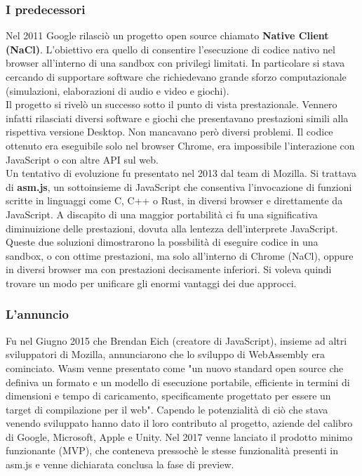 \subsubsection{I predecessori}
Nel 2011 Google rilasciò un progetto open source chiamato \textbf{Native Client (NaCl)}.
L'obiettivo era quello di consentire l'esecuzione di codice nativo nel browser all'interno di una sandbox con privilegi limitati.
In particolare si stava cercando di supportare software che richiedevano grande sforzo computazionale (simulazioni, elaborazioni di audio e video e giochi).
\\Il progetto si rivelò un successo sotto il punto di vista prestazionale. Vennero infatti rilasciati diversi software e giochi che presentavano prestazioni simili alla rispettiva versione Desktop.
Non mancavano però diversi problemi. Il codice ottenuto era eseguibile solo nel browser Chrome, era impossibile l'interazione con JavaScript o con altre API sul web.
\\Un tentativo di evoluzione fu presentato nel 2013 dal team di Mozilla. Si trattava di \textbf{asm.js}, un sottoinsieme di JavaScript che consentiva l'invocazione di funzioni scritte in linguaggi come C, C++ o Rust, in diversi browser e direttamente da JavaScript.
A discapito di una maggior portabilità ci fu una significativa diminuizione delle prestazioni, dovuta alla lentezza dell'interprete JavaScript.
Queste due soluzioni dimostrarono la possbilità di eseguire codice in una sandbox, o con ottime prestazioni, ma solo all'interno di Chrome (NaCl), oppure in diversi browser ma con prestazioni decisamente inferiori.
Si voleva quindi trovare un modo per unificare gli enormi vantaggi dei due approcci.
\subsubsection{L'annuncio}
Fu nel Giugno 2015 che Brendan Eich (creatore di JavaScript), insieme ad altri sviluppatori di Mozilla, annunciarono che lo sviluppo di WebAssembly era cominciato.
Wasm venne presentato come "un nuovo standard open source che definiva un formato e un modello di esecuzione portabile, efficiente in termini di dimensioni e tempo di caricamento, specificamente progettato per essere un target di compilazione per il web".
Capendo le potenzialità di ciò che stava venendo sviluppato hanno dato il loro contributo al progetto, aziende del calibro di Google, Microsoft, Apple e Unity.
Nel 2017 venne lanciato il prodotto minimo funzionante (MVP), che conteneva pressochè le stesse funzionalità presenti in asm.js e venne dichiarata conclusa la fase di preview.

